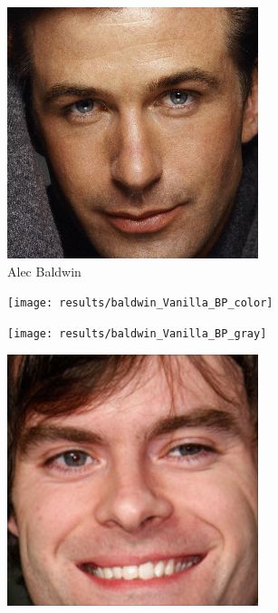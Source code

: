 \documentclass{article}
\begin{document}
\begin{figure}
	\ContinuedFloat
	\begin{subfigure}[t]{0.33\linewidth}
		\includegraphics[width=\linewidth]{most_baldwin}
		\caption{Alec Baldwin}
	\end{subfigure}
	\begin{subfigure}[t]{0.33\linewidth}
		\texttt{[image: results/baldwin\_Vanilla\_BP\_color]}
	\end{subfigure}
	\begin{subfigure}[t]{0.33\linewidth}
		\texttt{[image: results/baldwin\_Vanilla\_BP\_gray]}
	\end{subfigure}\vspace{1em}
	\begin{subfigure}[t]{0.33\linewidth}
		\includegraphics[width=\linewidth]{most_hader}

\end{subfigure}
\end{figure}
\end{document}
